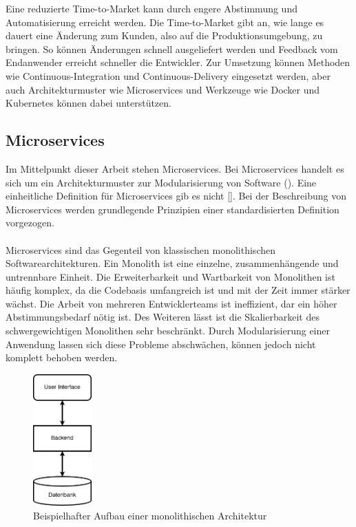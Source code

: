 Eine reduzierte Time-to-Market kann durch engere Abstimmung und Automatisierung erreicht werden. Die Time-to-Market gibt an, wie lange es dauert eine Änderung zum Kunden, also auf die Produktionsumgebung, zu bringen. So können Änderungen schnell ausgeliefert werden und Feedback vom Endanwender erreicht schneller die Entwickler. Zur Umsetzung können Methoden wie Continuous-Integration und Continuous-Delivery eingesetzt werden, aber auch Architekturmuster wie Microservices und Werkzeuge wie Docker und Kubernetes können dabei unterstützen.

\subsection{Microservices}

Im Mittelpunkt dieser Arbeit stehen Microservices. Bei Microservices handelt es sich um ein Architekturmuster zur Modularisierung von Software (\cite[S. 15]{newmanMicroservices2015}). Eine einheitliche Definition für Microservices gib es nicht [\cite[S. 2]{wolffMicroservices2018}]. Bei der Beschreibung von Microservices werden grundlegende Prinzipien einer standardisierten Definition vorgezogen. \\
\\
Microservices sind das Gegenteil von klassischen monolithischen Softwarearchitekturen. Ein Monolith ist eine einzelne, zusammenhängende und untrennbare Einheit. Die Erweiterbarkeit und Wartbarkeit von Monolithen ist häufig komplex, da die Codebasis umfangreich ist und mit der Zeit immer stärker wächst. Die Arbeit von mehreren Entwicklerteams ist ineffizient, dar ein höher Abstimmungsbedarf nötig ist. Des Weiteren lässt ist die Skalierbarkeit des schwergewichtigen Monolithen sehr beschränkt. Durch Modularisierung einer Anwendung lassen sich diese Probleme abschwächen, können jedoch nicht komplett behoben werden.

\begin{figure}[H] 
    \centering
    \includegraphics[width=0.2\textwidth]{figures/Monolith.png}
    \caption{Beispielhafter Aufbau einer monolithischen Architektur}
\end{figure}


